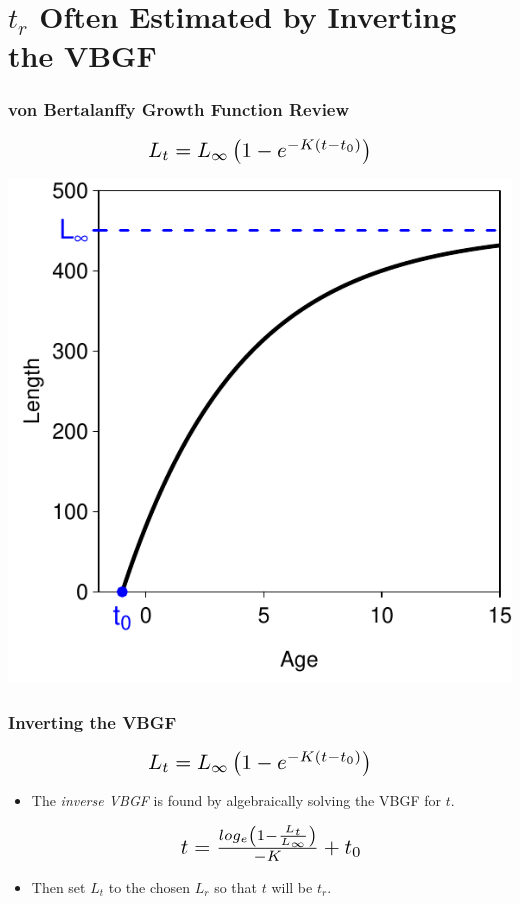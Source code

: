 \documentclass[xcolor=dvipsnames]{beamer}\usepackage[]{graphicx}\usepackage[]{color}
\newenvironment{knitrout}{}{} %
\newcommand*{\Scale}[2][4]{\scalebox{#1}{\ensuremath{#2}}}%
\begin{document}
\section{$t_{r}$ Often Estimated by Inverting the VBGF}

\begin{frame}[fragile, t]
\frametitle{von Bertalanffy Growth Function Review}

\[\Scale[1.5]{ L_{t} = L_{\infty}\left(1-e^{-K(t-t_{0})}\right) }\]

\bigskip
\begin{knitrout}\footnotesize
{}\color{fgcolor}

{\centering \includegraphics[width=.47\linewidth]{Figs/unnamed-chunk-3-1} 

}



\end{knitrout}
\end{frame}


\begin{frame}[fragile, t]
\frametitle{Inverting the VBGF}

\[\Scale[1.5]{ L_{t} = L_{\infty}\left(1-e^{-K(t-t_{0})}\right) }\]

\bigskip
\begin{itemize}
  \item The \textit{inverse VBGF} is found by algebraically solving the VBGF for $t$.
  \pause
  \bigskip

\[\Scale[1.5]{ t = \frac{log_{e}\left(1-\frac{L_{t}}{L_{\infty}}\right)}{-K} + t_{0} }\]

  \pause
  \bigskip
  \item Then set $L_{t}$ to the chosen $L_{r}$ so that $t$ will be $t_{r}$.
\end{itemize}
\end{frame}
\end{document}
